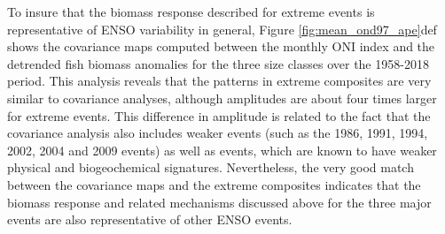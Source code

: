 To insure that the biomass response described for extreme \nino{} events is representative of ENSO variability in general, Figure \ref{fig:mean_ond97_ape}def shows the covariance maps computed between the monthly ONI index and the detrended fish biomass anomalies for the three size classes over the 1958-2018 period. This analysis reveals that the patterns in extreme \nino{} composites are very similar to covariance analyses, although amplitudes are about four times larger for extreme events. This  difference  in amplitude is related to the fact that the covariance analysis also includes weaker \nino{} events (such as the 1986, 1991, 1994, 2002, 2004 and 2009 events) as well as \nina{} events, which are known to have weaker physical and biogeochemical signatures. Nevertheless, the very good match between the covariance maps and the extreme \nino{} composites indicates that the biomass response and related mechanisms discussed above for the three major \nino{} events are also representative of other ENSO events.
